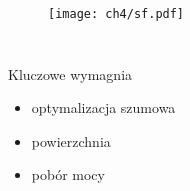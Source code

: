 \begin{columns}

    \begin{figure}[H]
        \texttt{[image: ch4/sf.pdf]}
    \end{figure}


\end{columns}

\begin{block}{Kluczowe wymagnia}
    \begin{itemize}
        \item optymalizacja szumowa
        \item powierzchnia
        \item pobór mocy
    \end{itemize}
     \end{block}